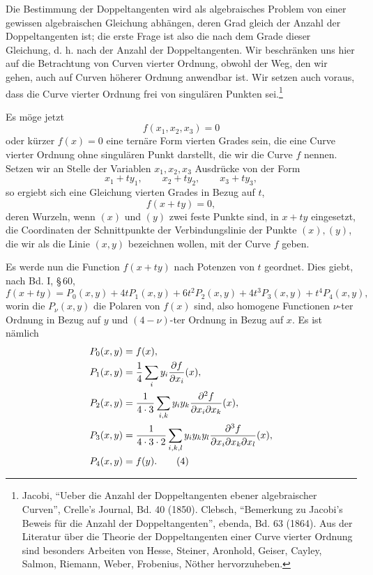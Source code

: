 \documentclass[11pt]{article}
\begin{document}
Die Bestimmung der Doppeltangenten wird als algebraisches Problem von einer gewissen algebraischen Gleichung abhängen, deren Grad gleich der Anzahl der Doppeltangenten ist; die erste Frage ist also die nach dem Grade dieser Gleichung, d. h. nach der Anzahl der Doppeltangenten. Wir beschränken uns hier auf die Betrachtung von Curven vierter Ordnung, obwohl der Weg, den wir gehen, auch auf Curven höherer Ordnung anwendbar ist. Wir setzen auch voraus, dass die Curve vierter Ordnung frei von singulären Punkten sei.\footnote{Jacobi, ``Ueber die Anzahl der Doppeltangenten ebener algebraischer Curven'', Crelle's Journal, Bd. 40 (1850). Clebsch, ``Bemerkung zu Jacobi's Beweis für die Anzahl der Doppeltangenten'', ebenda, Bd. 63 (1864). Aus der Literatur über die Theorie der Doppeltangenten einer Curve vierter Ordnung sind besonders Arbeiten von Hesse, Steiner, Aronhold, Geiser, Cayley, Salmon, Riemann, Weber, Frobenius, Nöther hervorzuheben.}

Es möge jetzt
\begin{equation}
 f(x_1,x_2,x_3)=0
 \tag{1}
\end{equation}
oder kürzer \(f(x)=0\) eine ternäre Form vierten Grades sein, die eine Curve vierter Ordnung ohne singulären Punkt darstellt, die wir die Curve \(f\) nennen. Setzen wir an Stelle der Variablen \(x_1,x_2,x_3\) Ausdrücke von der Form
\[
 x_1+t y_1,\qquad x_2+t y_2,\qquad x_3+t y_3,
\]
so ergiebt sich eine Gleichung vierten Grades in Bezug auf \(t\),
\begin{equation}
 f(x+t y)=0,
 \tag{2}
\end{equation}
deren Wurzeln, wenn \((x)\) und \((y)\) zwei feste Punkte sind, in \(x+t y\) eingesetzt, die Coordinaten der Schnittpunkte der Verbindungslinie der Punkte \((x),(y)\), die wir als die Linie \((x,y)\) bezeichnen wollen, mit der Curve \(f\) geben.

Es werde nun die Function \(f(x+t y)\) nach Potenzen von \(t\) geordnet. Dies giebt, nach Bd. I, \S\,60,
\begin{equation}
 f(x+t y)=P_0(x,y)+4tP_1(x,y)+6t^2P_2(x,y)+4t^3P_3(x,y)+t^4P_4(x,y),
 \tag{3}
\end{equation}
worin die \(P_\nu(x,y)\) die Polaren von \(f(x)\) sind, also homogene Functionen \(\nu\)-ter Ordnung in Bezug auf \(y\) und \((4-\nu)\)-ter Ordnung in Bezug auf \(x\). Es ist nämlich
\begin{align}
 P_0(x,y)&=f(x),\notag\\
 P_1(x,y)&=\frac14\sum_i y_i\frac{\partial f}{\partial x_i}(x),\notag\\
 P_2(x,y)&=\frac1{4\cdot3}\sum_{i,k}y_i y_k\frac{\partial^2 f}{\partial x_i\partial x_k}(x),\notag\\
 P_3(x,y)&=\frac1{4\cdot3\cdot2}\sum_{i,k,l}y_i y_k y_l\frac{\partial^3 f}{\partial x_i\partial x_k\partial x_l}(x),\notag\\
 P_4(x,y)&=f(y).
 \tag{4}
\end{align}
\end{document}

